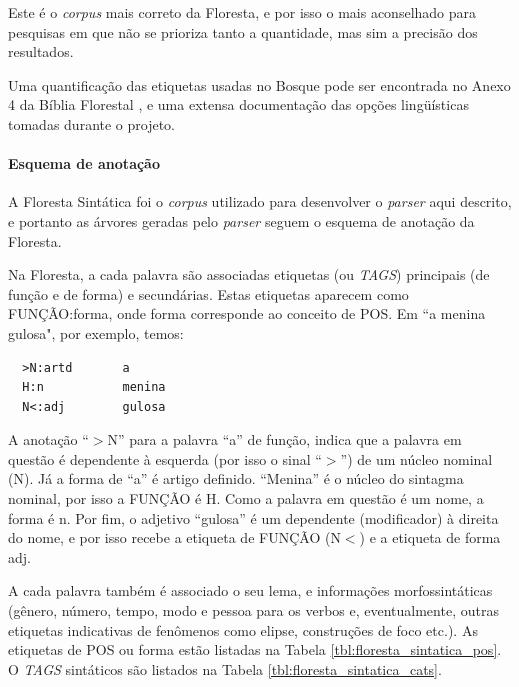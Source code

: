 Este é o \emph{corpus} mais correto da Floresta, e por isso o mais aconselhado para pesquisas em que não se prioriza tanto a quantidade, mas sim a precisão dos resultados.

Uma quantificação das etiquetas usadas no Bosque pode ser encontrada no Anexo 4 da Bíblia Florestal \cite{florestasintatica}, e uma extensa documentação das opções lingüísticas tomadas durante o projeto.


\paragraph{Esquema de anotação}\label{par:corpus_bosque_esquema}\hspace*{1in}

A Floresta Sintática foi o \emph{corpus} utilizado para desenvolver o \emph{parser} aqui descrito, e portanto as árvores geradas pelo \emph{parser} seguem o esquema de anotação da Floresta.

Na Floresta, a cada palavra são associadas etiquetas (ou \emph{TAGS}) principais (de função e de forma) e secundárias. Estas etiquetas aparecem como FUNÇÃO:forma, onde forma corresponde ao conceito de POS. Em ``a menina gulosa", por exemplo, temos:


\begin{verbatim}
  >N:artd       a
  H:n           menina
  N<:adj        gulosa
\end{verbatim}

A anotação ``$>$N'' para a palavra ``a'' de função, indica que a palavra em questão é dependente à esquerda (por isso o sinal ``$>$'') de um núcleo nominal (N). Já a forma de ``a'' é artigo definido. ``Menina'' é o núcleo do sintagma nominal, por isso a FUNÇÃO é H. Como a palavra em questão é um nome, a forma é n. Por fim, o adjetivo ``gulosa'' é um dependente (modificador) à direita do nome, e por isso recebe a etiqueta de FUNÇÃO (N$<$) e a etiqueta de forma adj.

A cada palavra também é associado o seu lema, e informações morfossintáticas (gênero, número, tempo, modo e pessoa para os verbos e, eventualmente, outras etiquetas indicativas de fenômenos como elipse, construções de foco etc.). As etiquetas de POS ou forma estão listadas na Tabela \ref{tbl:floresta_sintatica_pos}. O \emph{TAGS} sintáticos são listados na Tabela \ref{tbl:floresta_sintatica_cats}.

